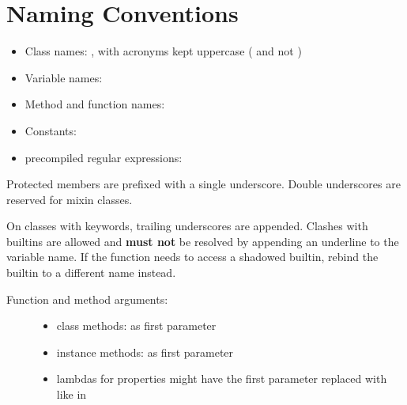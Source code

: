 \documentclass[a4paper,12pt]{sphinxmanual}
\begin{document}
\section{Naming Conventions}
\label{styleguide:naming-conventions}\begin{itemize}
\item {} 
Class names: , with acronyms kept uppercase (
and not )

\item {} 
Variable names: 

\item {} 
Method and function names: 

\item {} 
Constants: 

\item {} 
precompiled regular expressions: 

\end{itemize}

Protected members are prefixed with a single underscore.  Double
underscores are reserved for mixin classes.

On classes with keywords, trailing underscores are appended.  Clashes with
builtins are allowed and \textbf{must not} be resolved by appending an
underline to the variable name.  If the function needs to access a
shadowed builtin, rebind the builtin to a different name instead.
\begin{description}
\item[{Function and method arguments:}] \leavevmode\begin{itemize}
\item {} 
class methods:  as first parameter

\item {} 
instance methods:  as first parameter

\item {} 
lambdas for properties might have the first parameter replaced
with  like in 

\end{itemize}

\end{description}
\end{document}
